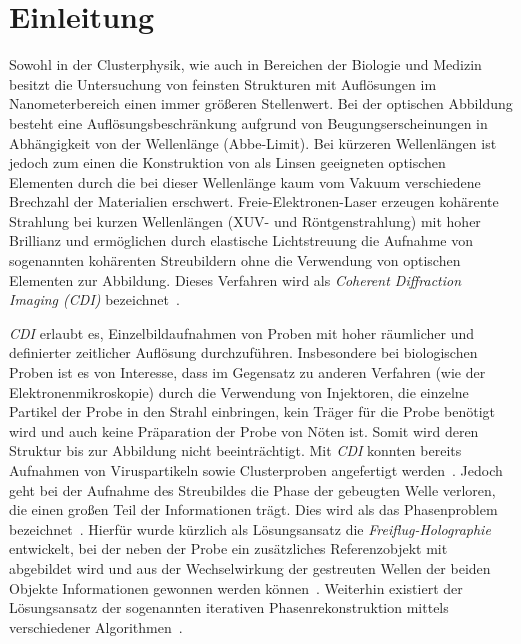 \chapter{Einleitung}
Sowohl in der Clusterphysik, wie auch in Bereichen der Biologie und Medizin besitzt die Untersuchung von feinsten Strukturen mit Auflösungen im Nanometerbereich einen immer größeren Stellenwert. Bei der optischen Abbildung besteht eine Auflösungsbeschränkung aufgrund von Beugungserscheinungen in Abhängigkeit von der Wellenlänge (Abbe-Limit). Bei kürzeren Wellenlängen ist jedoch zum einen die Konstruktion von als Linsen geeigneten optischen Elementen durch die bei dieser Wellenlänge kaum vom Vakuum verschiedene Brechzahl der Materialien erschwert. Freie-Elektronen-Laser erzeugen kohärente Strahlung bei kurzen Wellenlängen (XUV- und Röntgenstrahlung) mit hoher Brillianz und ermöglichen durch elastische Lichtstreuung die Aufnahme von sogenannten kohärenten Streubildern ohne die Verwendung von optischen Elementen zur Abbildung. Dieses Verfahren wird als \textit{Coherent Diffraction Imaging (CDI)} bezeichnet~\cite{schultz2013chapter7}.

\textit{CDI} erlaubt es, Einzelbildaufnahmen von Proben mit hoher räumlicher und definierter zeitlicher Auflösung durchzuführen. Insbesondere bei biologischen Proben ist es von Interesse, dass im Gegensatz zu anderen Verfahren (wie der Elektronenmikroskopie) durch die Verwendung von Injektoren, die einzelne Partikel der Probe in den Strahl einbringen, kein Träger für die Probe benötigt wird und auch keine Präparation der Probe von Nöten ist. Somit wird deren Struktur bis zur Abbildung nicht beeinträchtigt. Mit \textit{CDI} konnten bereits Aufnahmen von Viruspartikeln sowie Clusterproben angefertigt werden~\cite{seibert2011,barke2015}. Jedoch geht bei der Aufnahme des Streubildes die Phase der gebeugten Welle verloren, die einen großen Teil der Informationen trägt. Dies wird als das Phasenproblem bezeichnet~\cite{shechtman2015}. Hierfür wurde kürzlich als Lösungsansatz die \textit{Freiflug-Holographie} entwickelt, bei der neben der Probe ein zusätzliches Referenzobjekt mit abgebildet wird und aus der Wechselwirkung der gestreuten Wellen der beiden Objekte Informationen gewonnen werden können~\cite{gorkhover2016}. Weiterhin existiert der Lösungsansatz der sogenannten iterativen Phasenrekonstruktion mittels verschiedener Algorithmen~\cite{marchesini2007}. 

